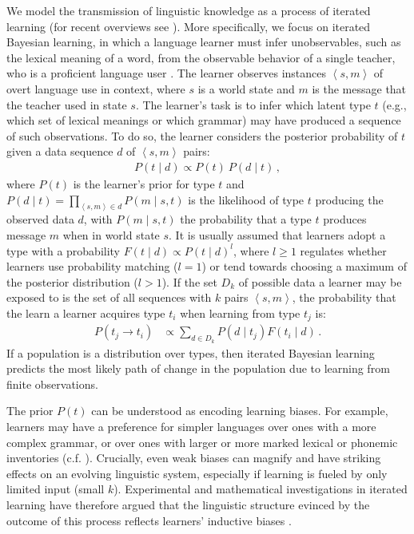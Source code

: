 \documentclass[10pt,a4paper]{article}
\newcommand{\tuple}[1]{\ensuremath{\left\langle #1 \right\rangle}}
\begin{document}
We model the transmission of linguistic knowledge as a process of iterated learning (for recent
overviews see \citealt{kirby+etal:2014, tamariz+kirby:2016}). More specifically, we focus on
iterated Bayesian learning, in which a language learner must infer unobservables, such as the
lexical meaning of a word, from the observable behavior of a single teacher, who is a
proficient language user \citep[e.g.][]{griffiths+kalish:2007,kirby+etal:2007}. The learner
observes instances $\tuple{s,m}$ of overt language use in context, where $s$ is a world state
and $m$ is the message that the teacher used in state $s$. The learner's task is to infer which
latent type $t$ (e.g., which set of lexical meanings or which grammar) may have produced a
sequence of such observations. To do so, the learner considers the posterior probability of $t$
given a data sequence $d$ of $\tuple{s, m}$ pairs:
\begin{align*}
  P(t \mid d) \propto P(t) \ P(d \mid t)\,,
\end{align*}
where $P(t)$ is the learner's prior for type $t$ and
$P(d \mid t) = \prod_{\tuple{s,m} \in d} P(m \mid s, t)$ is the likelihood of type $t$
producing the observed data $d$, with $P(m \mid s, t)$ the probability that a type $t$ produces
message $m$ when in world state $s$. It is usually assumed that learners adopt a type with a
probability $F(t \mid d) \propto P(t \mid d)^l$, where $l \ge 1$ regulates whether learners use
probability matching ($l = 1$) or tend towards choosing a maximum of the posterior distribution
($l > 1$). If the set $D_k$ of possible data a learner may be exposed to is the set of all
sequences with $k$ pairs $\tuple{s,m}$, the probability that the learn a learner
acquires type $t_i$ when learning from type $t_j$ is:
\begin{align*}
  P(t_j \rightarrow t_i) &\propto \sum_{d \in D_k} P(d \mid t_j) F(t_i \mid d)\,.
\end{align*}
If a population is a distribution over types, then iterated Bayesian learning predicts the most
likely path of change in the population due to learning from finite observations.

The prior $P(t)$ can be understood as encoding learning biases. For example, learners may have
a preference for simpler languages over ones with a more complex grammar, or over ones with larger or more marked
 lexical or phonemic inventories (c.f. \citealt{feldman:2000,chater+vitanyi:2003,
  kirby+etal:2015}). Crucially, even weak biases can magnify and have striking effects on an
evolving linguistic system, especially if learning is fueled by only limited input (small
$k$). Experimental and mathematical investigations in iterated learning have therefore argued
that the linguistic structure evinced by the outcome of this process reflects learners'
inductive biases \citep{kirby+etal:2007,kirby+etal:2014}.
\end{document}
